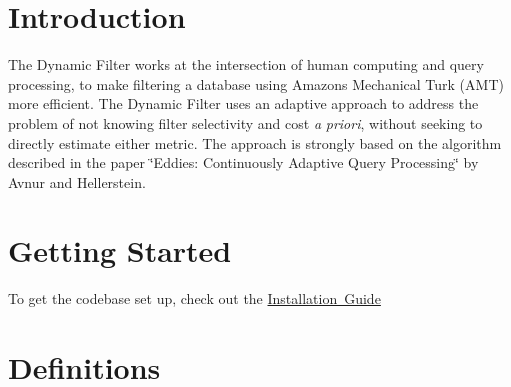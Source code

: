 \hypertarget{index_intro}{}\section{Introduction}\label{index_intro}
The Dynamic Filter works at the intersection of human computing and query processing, to make filtering a database using Amazon\textquotesingle{}s Mechanical Turk (A\+MT) more efficient. The Dynamic Filter uses an adaptive approach to address the problem of not knowing filter selectivity and cost {\itshape a} {\itshape priori}, without seeking to directly estimate either metric. The approach is strongly based on the algorithm described in the paper \char`\"{}\+Eddies\+: Continuously Adaptive Query Processing\char`\"{} by Avnur and Hellerstein.\hypertarget{index_gettingstarted}{}\section{Getting Started}\label{index_gettingstarted}
To get the codebase set up, check out the \mbox{\hyperlink{install_info}{Installation Guide}}\hypertarget{index_defs}{}\section{Definitions}\label{index_defs}

